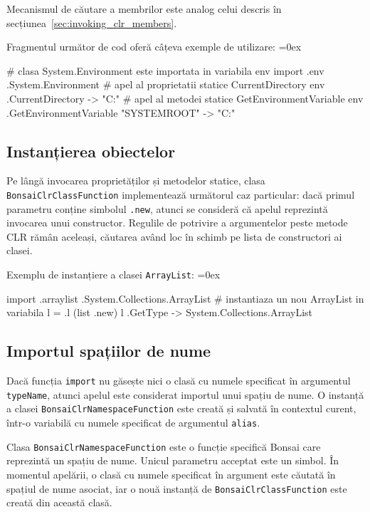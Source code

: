 \documentclass[12pt,a4paper]{memoir}
\renewcommand{\c}{\texttt}
\newenvironment{code}
{
\definecolor{shadecolor}{gray}{0.91}
\topsep=0ex
\relax
\shaded
\verbatim
}
{
\endverbatim
\endshaded
}
\begin{document}
Mecanismul de căutare a membrilor este analog celui descris în secțiunea \ref{sec:invoking_clr_members}.

Fragmentul următor de cod oferă câțeva exemple de utilizare:
\begin{code}
# clasa System.Environment este importata in variabila env
import .env .System.Environment
# apel al proprietatii statice CurrentDirectory
env .CurrentDirectory
  -> "C:\Users\Eugen\Projects"
# apel al metodei statice GetEnvironmentVariable
env .GetEnvironmentVariable "SYSTEMROOT"
  -> "C:\Windows"
\end{code}

\subsection{Instanțierea obiectelor}

Pe lângă invocarea proprietăților și metodelor statice, clasa \c{BonsaiClrClassFunction} implementează următorul caz particular: dacă primul parametru conține simbolul \c{.new}, atunci se consideră că apelul reprezintă invocarea unui constructor. Regulile de potrivire a argumentelor peste metode CLR rămân aceleași, căutarea având loc în schimb pe lista de constructori ai clasei.

Exemplu de instanțiere a clasei \c{ArrayList}:
\begin{code}
import .arraylist .System.Collections.ArrayList
# instantiaza un nou ArrayList in variabila l
= .l (list .new)
l .GetType
  -> System.Collections.ArrayList
\end{code}

\subsection{Importul spațiilor de nume}

Dacă funcția \c{import} nu găsește nici o clasă cu numele specificat în argumentul \c{typeName}, atunci apelul este considerat importul unui spațiu de nume. O instanță a clasei \c{BonsaiClrNamespaceFunction} este creată și salvată în contextul curent, într-o variabilă cu numele specificat de argumentul \c{alias}.

Clasa \c{BonsaiClrNamespaceFunction} este o funcție specifică Bonsai care reprezintă un spațiu de nume. Unicul parametru acceptat este un simbol. În momentul apelării, o clasă cu numele specificat în argument este căutată în spațiul de nume asociat, iar o nouă instanță de \c{BonsaiClrClassFunction} este creată din această clasă.
\end{document}
